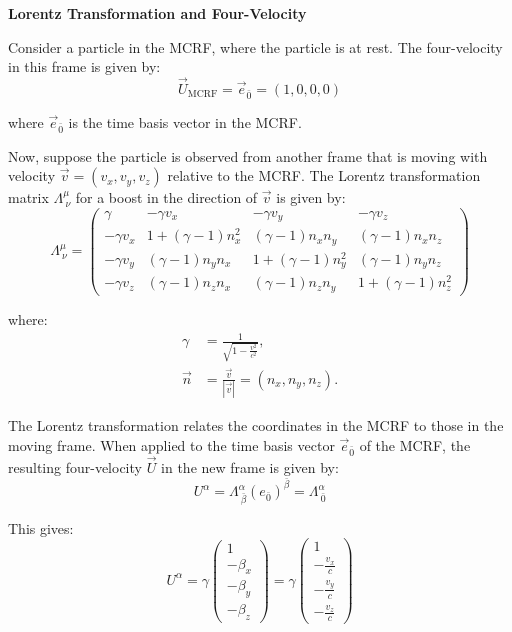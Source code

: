 \documentclass[12pt]{book}
\begin{document}
            \textbf{Lorentz Transformation and Four-Velocity}

            Consider a particle in the MCRF, where the particle is at rest. The four-velocity in this frame is given by:
            \[
            \vec{U}_{\text{MCRF}} = \vec{e}_{\bar{0}} = (1, 0, 0, 0)
            \]
            
            where \( \vec{e}_{\bar{0}} \) is the time basis vector in the MCRF.
            
            Now, suppose the particle is observed from another frame that is moving with velocity \( \vec{v} = (v_x, v_y, v_z) \) relative to the MCRF. The Lorentz transformation matrix \( \Lambda^\mu_{\ \nu} \) for a boost in the direction of \( \vec{v} \) is given by:
            \[
            \Lambda^\mu_{\ \nu} =
            \begin{pmatrix}
            \gamma & -\gamma v_x & -\gamma v_y & -\gamma v_z \\
            -\gamma v_x & 1 + (\gamma - 1)n_x^2 & (\gamma - 1)n_x n_y & (\gamma - 1)n_x n_z \\
            -\gamma v_y & (\gamma - 1)n_y n_x & 1 + (\gamma - 1)n_y^2 & (\gamma - 1)n_y n_z \\
            -\gamma v_z & (\gamma - 1)n_z n_x & (\gamma - 1)n_z n_y & 1 + (\gamma - 1)n_z^2
            \end{pmatrix}
            \]
            
            where:
            \begin{align*}
            \gamma &= \frac{1}{\sqrt{1 - \frac{v^2}{c^2}}}, \\
            \vec{n} &= \frac{\vec{v}}{|\vec{v}|} = (n_x, n_y, n_z).
            \end{align*}
            
            The Lorentz transformation relates the coordinates in the MCRF to those in the moving frame. When applied to the time basis vector \( \vec{e}_{\bar{0}} \) of the MCRF, the resulting four-velocity \( \vec{U} \) in the new frame is given by:  
            \[
            U^\alpha = \Lambda^\alpha_{\ \bar{\beta}} (e_{\bar{0}})^{\bar{\beta}} = \Lambda^\alpha_{\ \bar{0}}
            \]
            
            This gives:
            \[
            U^\alpha = \gamma \begin{pmatrix} 1 \\ -\beta_x \\ -\beta_y \\ -\beta_z \end{pmatrix} 
            = \gamma \begin{pmatrix} 1 \\ -\frac{v_x}{c} \\ -\frac{v_y}{c} \\ -\frac{v_z}{c} \end{pmatrix}
            \]
            
\end{document}
